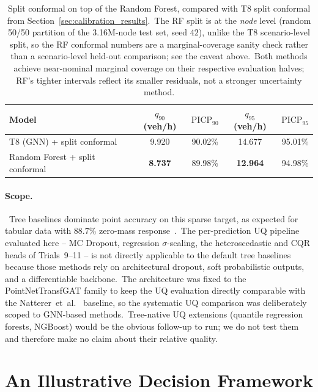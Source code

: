\begin{table}[htbp]
\centering
\caption[RF + split conformal vs T8 + split conformal]{Split conformal on top of the Random Forest, compared with T8 split conformal from Section~\ref{sec:calibration_results}.\ The RF split is at the \emph{node} level (random 50/50 partition of the 3.16M-node test set, seed $42$), unlike the T8 scenario-level split, so the RF conformal numbers are a marginal-coverage sanity check rather than a scenario-level held-out comparison; see the caveat above.\ Both methods achieve near-nominal marginal coverage on their respective evaluation halves; RF's tighter intervals reflect its smaller residuals, not a stronger uncertainty method.}
\label{tab:non_gnn_conformal}
\begin{tabular}{lcccc}
\toprule
Model & $q_{90}$ (veh/h) & $\mathrm{PICP}_{90}$ & $q_{95}$ (veh/h) & $\mathrm{PICP}_{95}$ \\
\midrule
T8 (GNN) + split conformal & 9.920 & 90.02\% & 14.677 & 95.01\% \\
Random Forest + split conformal & \textbf{8.737} & 89.98\% & \textbf{12.964} & 94.98\% \\
\bottomrule
\end{tabular}
\end{table}

\paragraph{Scope.}\ Tree baselines dominate point accuracy on this sparse target, as expected for tabular data with $88.7\%$ zero-mass response~\cite{grinsztajn2022tree,borisov2022deep}.\ The per-prediction UQ pipeline evaluated here -- MC Dropout, regression $\sigma$-scaling, the heteroscedastic and CQR heads of Trials~9--11 -- is not directly applicable to the default tree baselines because those methods rely on architectural dropout, soft probabilistic outputs, and a differentiable backbone.\ The architecture was fixed to the PointNetTransfGAT family to keep the UQ evaluation directly comparable with the Natterer~et~al.~\cite{natterer2025ml} baseline, so the systematic UQ comparison was deliberately scoped to GNN-based methods.\ Tree-native UQ extensions (quantile regression forests, NGBoost) would be the obvious follow-up to run; we do not test them and therefore make no claim about their relative quality.

\section{An Illustrative Decision Framework}\label{sec:deployment}

